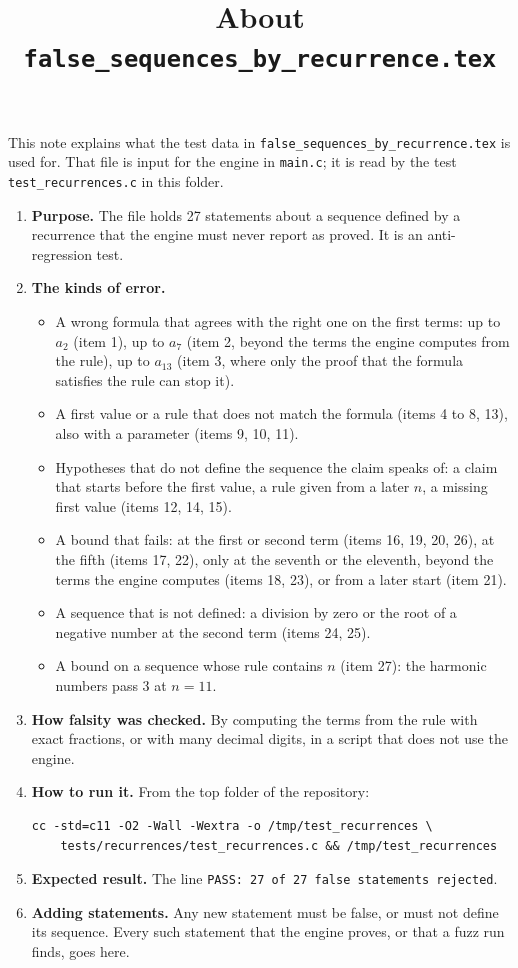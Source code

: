 \documentclass[11pt,a4paper]{article}
\title{About \texttt{false\_sequences\_by\_recurrence.tex}}
\author{}
\date{}
\begin{document}
\maketitle
This note explains what the test data in \texttt{false\_sequences\_by\_recurrence.tex} is used for. That file is input for the engine in \texttt{main.c}; it is read by the test \texttt{test\_recurrences.c} in this folder.

\begin{enumerate}
\item \textbf{Purpose.} The file holds 27 statements about a sequence defined by a recurrence that the engine must never report as proved. It is an anti-regression test.

\item \textbf{The kinds of error.}
\begin{itemize}
\item A wrong formula that agrees with the right one on the first terms: up to $a_2$ (item 1), up to $a_7$ (item 2, beyond the terms the engine computes from the rule), up to $a_{13}$ (item 3, where only the proof that the formula satisfies the rule can stop it).
\item A first value or a rule that does not match the formula (items 4 to 8, 13), also with a parameter (items 9, 10, 11).
\item Hypotheses that do not define the sequence the claim speaks of: a claim that starts before the first value, a rule given from a later $n$, a missing first value (items 12, 14, 15).
\item A bound that fails: at the first or second term (items 16, 19, 20, 26), at the fifth (items 17, 22), only at the seventh or the eleventh, beyond the terms the engine computes (items 18, 23), or from a later start (item 21).
\item A sequence that is not defined: a division by zero or the root of a negative number at the second term (items 24, 25).
\item A bound on a sequence whose rule contains $n$ (item 27): the harmonic numbers pass $3$ at $n = 11$.
\end{itemize}

\item \textbf{How falsity was checked.} By computing the terms from the rule with exact fractions, or with many decimal digits, in a script that does not use the engine.

\item \textbf{How to run it.} From the top folder of the repository:
\begin{verbatim}
cc -std=c11 -O2 -Wall -Wextra -o /tmp/test_recurrences \
    tests/recurrences/test_recurrences.c && /tmp/test_recurrences
\end{verbatim}

\item \textbf{Expected result.} The line \texttt{PASS: 27 of 27 false statements rejected}.

\item \textbf{Adding statements.} Any new statement must be false, or must not define its sequence. Every such statement that the engine proves, or that a fuzz run finds, goes here.
\end{enumerate}
\end{document}
